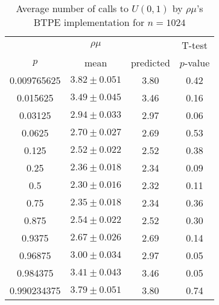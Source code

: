 \begin{table}[t]
\caption{Average number of calls to $U(0,1)$ by $\rho\mu$'s BTPE implementation for $n=1024$}
\label{tab:calls1024}
\begin{tabular}{cccc} \hline
    & $\rho\mu$ & & T-test \\
$p$ & mean & predicted & $p$-value \\ \hline
0.009765625  & $3.82 \pm 0.051$ & 3.80 & 0.42 \\
0.015625     & $3.49 \pm 0.045$ & 3.46 & 0.16 \\
0.03125      & $2.94 \pm 0.033$ & 2.97 & 0.06 \\
0.0625       & $2.70 \pm 0.027$ & 2.69 & 0.53 \\
0.125        & $2.52 \pm 0.022$ & 2.52 & 0.38 \\
0.25         & $2.36 \pm 0.018$ & 2.34 & 0.09 \\
0.5          & $2.30 \pm 0.016$ & 2.32 & 0.11 \\
0.75         & $2.35 \pm 0.018$ & 2.34 & 0.36 \\
0.875        & $2.54 \pm 0.022$ & 2.52 & 0.30 \\
0.9375       & $2.67 \pm 0.026$ & 2.69 & 0.14 \\
0.96875      & $3.00 \pm 0.034$ & 2.97 & 0.05 \\
0.984375     & $3.41 \pm 0.043$ & 3.46 & 0.05 \\
0.990234375  & $3.79 \pm 0.051$ & 3.80 & 0.74 \\
\hline
\end{tabular}
\end{table}

